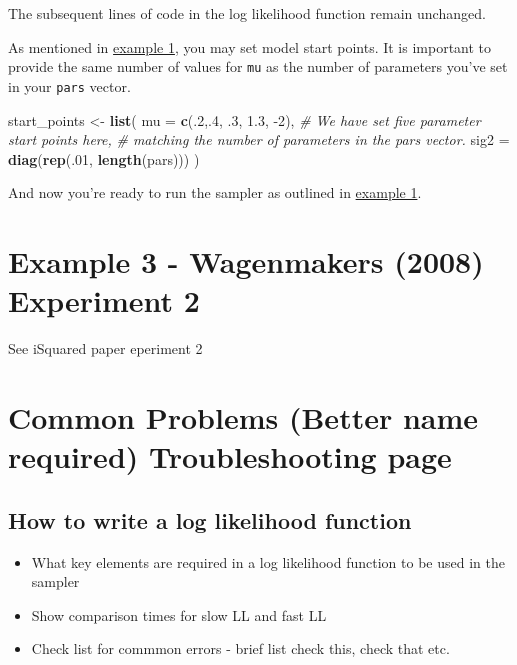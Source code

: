 \documentclass[]{book}
\newenvironment{Shaded}{\begin{snugshade}}{\end{snugshade}}
\newcommand{\CommentTok}[1]{\textcolor[rgb]{0.56,0.35,0.01}{\textit{#1}}}
\newcommand{\DataTypeTok}[1]{\textcolor[rgb]{0.13,0.29,0.53}{#1}}
\newcommand{\DecValTok}[1]{\textcolor[rgb]{0.00,0.00,0.81}{#1}}
\newcommand{\FloatTok}[1]{\textcolor[rgb]{0.00,0.00,0.81}{#1}}
\newcommand{\KeywordTok}[1]{\textcolor[rgb]{0.13,0.29,0.53}{\textbf{#1}}}
\newcommand{\NormalTok}[1]{#1}
\newcommand{\StringTok}[1]{\textcolor[rgb]{0.31,0.60,0.02}{#1}}
\providecommand{\tightlist}{%
  \setlength{\itemsep}{0pt}\setlength{\parskip}{0pt}}
\begin{document}
The subsequent lines of code in the log likelihood function remain unchanged.

As mentioned in \protect\hyperlink{start-points}{example 1}, you may set model start points. It is important to provide the same number of values for \texttt{mu} as the number of parameters you've set in your \texttt{pars} vector.

\begin{Shaded}
\begin{Highlighting}[]
\NormalTok{start_points <-}\StringTok{ }\KeywordTok{list}\NormalTok{(}
  \DataTypeTok{mu =} \KeywordTok{c}\NormalTok{(.}\DecValTok{2}\NormalTok{,.}\DecValTok{4}\NormalTok{, }\FloatTok{.3}\NormalTok{, }\FloatTok{1.3}\NormalTok{, }\DecValTok{-2}\NormalTok{), }\CommentTok{# We have set five parameter start points here, }
                              \CommentTok{# matching the number of parameters in the pars vector.}
  \DataTypeTok{sig2 =} \KeywordTok{diag}\NormalTok{(}\KeywordTok{rep}\NormalTok{(.}\DecValTok{01}\NormalTok{, }\KeywordTok{length}\NormalTok{(pars)))}
\NormalTok{)}
\end{Highlighting}
\end{Shaded}

And now you're ready to run the sampler as outlined in \protect\hyperlink{run-sampler}{example 1}.

\hypertarget{example-3---wagenmakers-2008-experiment-2}{%
\chapter{Example 3 - Wagenmakers (2008) Experiment 2}\label{example-3---wagenmakers-2008-experiment-2}}

See iSquared paper eperiment 2

\hypertarget{common-problems-better-name-required-troubleshooting-page}{%
\chapter{Common Problems (Better name required) Troubleshooting page}\label{common-problems-better-name-required-troubleshooting-page}}

\hypertarget{how-to-write-a-log-likelihood-function}{%
\section{How to write a log likelihood function}\label{how-to-write-a-log-likelihood-function}}

\begin{itemize}
\tightlist
\item
  What key elements are required in a log likelihood function to be used in the sampler
\item
  Show comparison times for slow LL and fast LL
\item
  Check list for commmon errors - brief list check this, check that etc.
\end{itemize}
\end{document}
